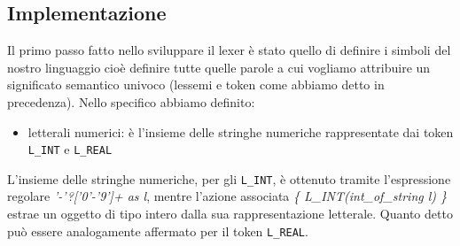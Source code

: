\documentclass[a4paper,10pt]{article}
\begin{document}
\subsection{Implementazione}
Il primo passo fatto nello sviluppare il lexer \`e stato quello di definire i 
simboli del nostro linguaggio cio\`e definire tutte quelle parole a cui vogliamo
attribuire un significato semantico univoco (lessemi e token come abbiamo detto
in precedenza). Nello specifico abbiamo definito:
\begin{itemize}
 \item letterali numerici: \`e l'insieme delle stringhe numeriche 
rappresentate dai token \verb|L_INT| e \verb|L_REAL|
\end{itemize}
L'insieme delle stringhe numeriche, per gli \verb|L_INT|, \`e ottenuto 
tramite l'espressione regolare \textit{'-'?['0'-'9']+ as l}, mentre l'azione
associata \textit{\{ L\_INT(int\_of\_string l) \}} estrae un oggetto di tipo
intero dalla sua rappresentazione letterale.
Quanto detto pu\`o essere analogamente affermato per il token \verb|L_REAL|.
\end{document}
